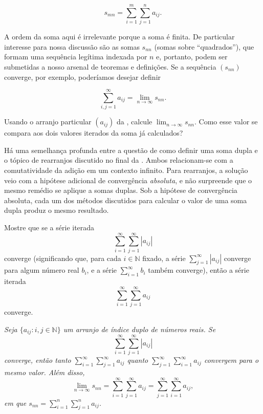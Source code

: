 \[
s_{mn} = \sum_{i=1}^{m} \sum_{j=1}^{n} a_{ij}. \tag{1}
\]

A ordem da soma aqui é irrelevante porque a soma é finita. De particular interesse para nossa discussão são as somas $s_{nn}$ (somas sobre ``quadrados''), que formam uma sequência legítima indexada por $n$ e, portanto, podem ser submetidas a nosso arsenal de teoremas e definições. Se a sequência $(s_{nn})$ converge, por exemplo, poderíamos desejar definir

\[
\sum_{i,j=1}^{\infty} a_{ij} = \lim_{n \to \infty} s_{nn}.
\]

\begin{exercise}\label{ex:2-8-1}
Usando o arranjo particular $(a_{ij})$ da , calcule $\lim_{n \to \infty} s_{nn}$. Como esse valor se compara aos dois valores iterados da soma já calculados?
\end{exercise}

Há uma semelhança profunda entre a questão de como definir uma soma dupla e o tópico de rearranjos discutido no final da . Ambos relacionam-se com a comutatividade da adição em um contexto infinito. Para rearranjos, a solução veio com a hipótese adicional de convergência \textit{absoluta}, e não surpreende que o mesmo remédio se aplique a somas duplas. Sob a hipótese de convergência absoluta, cada um dos métodos discutidos para calcular o valor de uma soma dupla produz o mesmo resultado.

\begin{exercise}\label{ex:2-8-2}
Mostre que se a série iterada
\[
\sum_{i=1}^{\infty} \sum_{j=1}^{\infty} |a_{ij}|
\]
converge (significando que, para cada $i \in \mathbb{N}$ fixado, a série $\sum_{j=1}^{\infty} |a_{ij}|$ converge para algum número real $b_i$, e a série $\sum_{i=1}^{\infty} b_i$ também converge), então a série iterada
\[
\sum_{i=1}^{\infty} \sum_{j=1}^{\infty} a_{ij}
\]
converge.
\end{exercise}

\begin{theorem}\label{thm:soma-dupla}
\textit{Seja $\{a_{ij} : i, j \in \mathbb{N}\}$ um arranjo de índice duplo de números reais. Se}
\[
\sum_{i=1}^{\infty} \sum_{j=1}^{\infty} |a_{ij}|
\]
\textit{converge, então tanto $\sum_{i=1}^{\infty} \sum_{j=1}^{\infty} a_{ij}$ quanto $\sum_{j=1}^{\infty} \sum_{i=1}^{\infty} a_{ij}$ convergem para o mesmo valor. Além disso,}
\[
\lim_{n \to \infty} s_{nn} = \sum_{i=1}^{\infty} \sum_{j=1}^{\infty} a_{ij} = \sum_{j=1}^{\infty} \sum_{i=1}^{\infty} a_{ij},
\]
\textit{em que $s_{nn} = \sum_{i=1}^{n} \sum_{j=1}^{n} a_{ij}$.}
\end{theorem}

